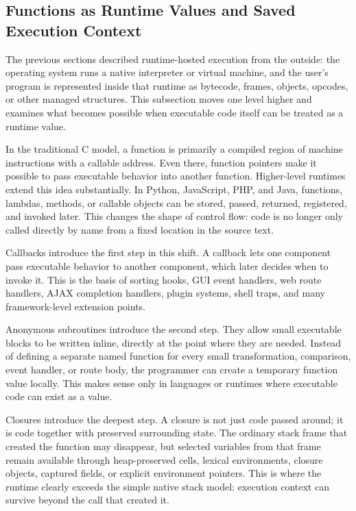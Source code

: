 \subsection{Functions as Runtime Values and Saved Execution Context}

The previous sections described runtime-hosted execution from the outside: the operating system runs a native interpreter or virtual machine, and the user's program is represented inside that runtime as bytecode, frames, objects, opcodes, or other managed structures. This subsection moves one level higher and examines what becomes possible when executable code itself can be treated as a runtime value.

In the traditional C model, a function is primarily a compiled region of machine instructions with a callable address. Even there, function pointers make it possible to pass executable behavior into another function. Higher-level runtimes extend this idea substantially. In Python, JavaScript, PHP, and Java, functions, lambdas, methods, or callable objects can be stored, passed, returned, registered, and invoked later. This changes the shape of control flow: code is no longer only called directly by name from a fixed location in the source text.

Callbacks introduce the first step in this shift. A callback lets one component pass executable behavior to another component, which later decides when to invoke it. This is the basis of sorting hooks, GUI event handlers, web route handlers, AJAX completion handlers, plugin systems, shell traps, and many framework-level extension points.

Anonymous subroutines introduce the second step. They allow small executable blocks to be written inline, directly at the point where they are needed. Instead of defining a separate named function for every small transformation, comparison, event handler, or route body, the programmer can create a temporary function value locally. This makes sense only in languages or runtimes where executable code can exist as a value.

Closures introduce the deepest step. A closure is not just code passed around; it is code together with preserved surrounding state. The ordinary stack frame that created the function may disappear, but selected variables from that frame remain available through heap-preserved cells, lexical environments, closure objects, captured fields, or explicit environment pointers. This is where the runtime clearly exceeds the simple native stack model: execution context can survive beyond the call that created it.

